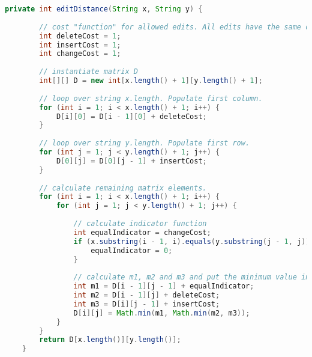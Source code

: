 \begin{lstlisting}[language={Java}, caption={Our implementation of an algorithm for calculating the Levenshtein distance.}, label={lst:levenshtein}]
	private int editDistance(String x, String y) {
	
		// cost "function" for allowed edits. All edits have the same cost.
		int deleteCost = 1;
		int insertCost = 1;
		int changeCost = 1;
		
		// instantiate matrix D
		int[][] D = new int[x.length() + 1][y.length() + 1];
		
		// loop over string x.length. Populate first column.
		for (int i = 1; i < x.length() + 1; i++) {
			D[i][0] = D[i - 1][0] + deleteCost;
		}
		
		// loop over string y.length. Populate first row.
		for (int j = 1; j < y.length() + 1; j++) {
			D[0][j] = D[0][j - 1] + insertCost;
		}
		
		// calculate remaining matrix elements.
		for (int i = 1; i < x.length() + 1; i++) {
			for (int j = 1; j < y.length() + 1; j++) {
		
				// calculate indicator function
				int equalIndicator = changeCost;
				if (x.substring(i - 1, i).equals(y.substring(j - 1, j))) {
					equalIndicator = 0;
				}
				
				// calculate m1, m2 and m3 and put the minimum value into the matrix element Dij.
				int m1 = D[i - 1][j - 1] + equalIndicator;
				int m2 = D[i - 1][j] + deleteCost;
				int m3 = D[i][j - 1] + insertCost;
				D[i][j] = Math.min(m1, Math.min(m2, m3));
			}
		}
		return D[x.length()][y.length()];
	}
\end{lstlisting}